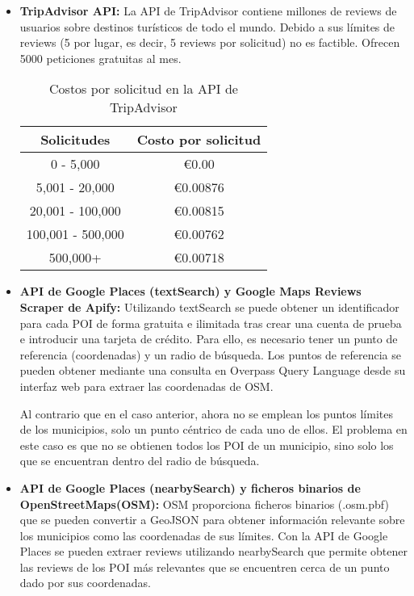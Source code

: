 \begin{itemize}
    \item \textbf{TripAdvisor API:} La API de TripAdvisor contiene millones de reviews de usuarios sobre destinos turísticos de todo el mundo. Debido a sus límites de reviews\cite{tripadvisor:overview} (5 por lugar, es decir, 5 reviews por solicitud) no es factible.
    Ofrecen 5000 peticiones gratuitas al mes. \cite{tripadvisor:prices}
    \begin{table}[h!]
        \centering
        \begin{tabular}{|c|c|}
            \hline
            \textbf{Solicitudes} & \textbf{Costo por solicitud} \\
            \hline
            0 - 5,000 & €0.00 \\
            5,001 - 20,000 & €0.00876 \\
            20,001 - 100,000 & €0.00815 \\
            100,001 - 500,000 & €0.00762 \\
            500,000+ & €0.00718 \\
            \hline
        \end{tabular}
        \caption{Costos por solicitud en la API de TripAdvisor}
    \end{table}
    \item \textbf{API de Google Places (textSearch) y Google Maps Reviews Scraper de Apify:} Utilizando textSearch se puede obtener un identificador para cada POI de forma gratuita e ilimitada tras crear una cuenta de prueba e introducir una tarjeta de crédito. Para ello, es necesario tener un punto de referencia (coordenadas) y un radio de búsqueda.  
    Los puntos de referencia se pueden obtener mediante una consulta en Overpass Query Language desde su interfaz web para extraer las coordenadas de OSM. 
    
    Al contrario que en el caso anterior, ahora no se emplean los puntos límites de los municipios, solo un punto céntrico de cada uno de ellos.
    El problema en este caso es que no se obtienen todos los POI de un municipio, sino solo los que se encuentran dentro del radio de búsqueda.
    \item \textbf{API de Google Places (nearbySearch) y ficheros binarios de OpenStreetMaps(OSM):} OSM proporciona ficheros binarios (.osm.pbf) que se pueden convertir a GeoJSON para obtener información relevante sobre los municipios como las coordenadas de sus límites. 
    Con la API de Google Places se pueden extraer reviews utilizando nearbySearch que permite obtener las reviews de los POI más relevantes que se encuentren cerca de un punto dado por sus coordenadas. 
    

\end{itemize}
